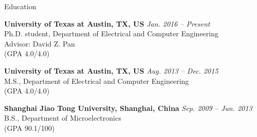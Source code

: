

\begin{rSection}{Education}


{\bf University of Texas at Austin, TX, US} \hfill {\em Jan. 2016 -- Present} \\ 
Ph.D. student, Department of Electrical and Computer Engineering \\
Advisor: David Z. Pan \\
(GPA 4.0/4.0) 

{\bf University of Texas at Austin, TX, US} \hfill {\em Aug. 2013 -- Dec. 2015} \\ 
M.S., Department of Electrical and Computer Engineering \\
(GPA 4.0/4.0) 

{\bf Shanghai Jiao Tong University, Shanghai, China} \hfill {\em Sep. 2009 -- Jun. 2013} \\ 
B.S., Department of Microelectronics \\
(GPA 90.1/100)

\end{rSection}

